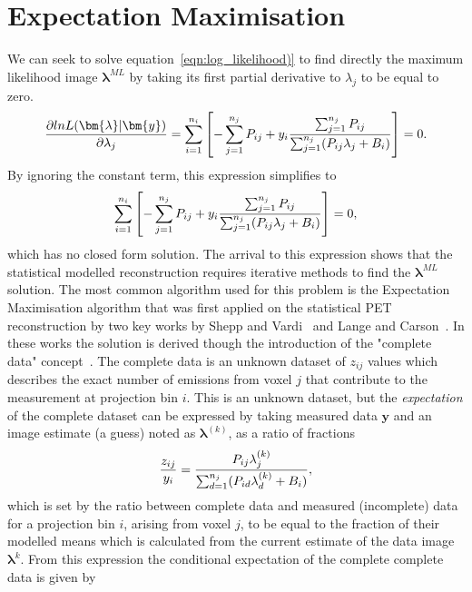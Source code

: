 \section{Expectation Maximisation}
We can seek to solve equation~\ref{eqn:log_likelihood)} to find directly the maximum likelihood image $\bm{\lambda}^{ML}$ by taking its first partial derivative to $\lambda_j$ to be equal to zero. 
\begin{equation}
\frac{\partial lnL(\bm{\lambda}|\bm{y})}{\partial \lambda_j} = \sum_{i=1}^{n_i}\left[  -\sum_{j=1}^{n_j} P_{ij} + 
y_i \frac{\sum_{j=1}^{n_j} P_{ij} }{\sum_{j=1}^{n_j} (P_{ij} \lambda_j + B_i)}
\right]  = 0 \\. 
\end{equation}
By ignoring the constant term, this expression simplifies to 
\begin{equation}
\sum_{i=1}^{n_i}\left[  -\sum_{j=1}^{n_j} P_{ij} + 
y_i \frac{\sum_{j=1}^{n_j} P_{ij} }{\sum_{j=1}^{n_j} (P_{ij} \lambda_j + B_i)} \right]  = 0 \\,
\end{equation}
which has no closed form solution. The arrival to this expression shows that the statistical modelled reconstruction requires iterative methods to find the $\bm{\lambda}^{ML}$ solution. The most common algorithm used for this problem is the Expectation Maximisation algorithm that was first applied on the statistical PET reconstruction by two key works by Shepp and Vardi~\cite{Vardi1985} and Lange and Carson~\cite{Lange1984}. In these works the solution is derived though the introduction of the "complete data" concept~\cite{Dempster1977}. The complete data is an unknown dataset of $z_{ij}$ values which describes the exact number of emissions from voxel $j$ that contribute to the measurement at projection bin $i$. This is an unknown dataset, but the \textit{expectation} of the complete dataset can be expressed by taking measured data $\bm{y}$ and an image estimate (a guess) noted as $\bm{\lambda}^{(k)}$, as a ratio of fractions
\begin{equation}
\frac{z_{ij}}{y_i} = 
\frac{P_{ij} \lambda_j^{(k)}}{\sum_{d=1}^{n_j} (P_{id}\lambda_d^{(k)} + B_i)} \\,
\end{equation}
which is set by the ratio between complete data and measured (incomplete) data for a projection bin $i$, arising from voxel $j$, to be equal to the fraction of their modelled means which is calculated from the current estimate of the data image  $\bm{\lambda}^k$. From this expression the conditional expectation of the complete complete data is given by
